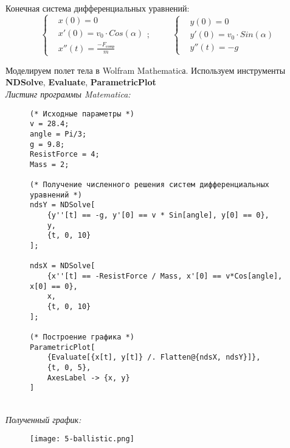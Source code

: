 Конечная система дифференциальных уравнений:
\begin{equation*}
    \left\{
        \begin{aligned}
            &x(0) = 0 \\
            &x'(0) = v_{0} \cdot Cos(\alpha) \\
            &x''(t) = \frac{-F_{\text{сопр}}}{m}
        \end{aligned}
    \right.; \;\;\;\;\;\;\;\;\;
    \left\{
        \begin{aligned}
            &y(0) = 0 \\
            &y'(0) = v_{0} \cdot Sin(\alpha) \\
            &y''(t) = -g
        \end{aligned}
    \right. \end{equation*}

\newpage
Моделируем полет тела в Wolfram Mathematicа. 
Используем инструменты 
\textbf{NDSolve}, 
\textbf{Evaluate},
\textbf{ParametricPlot}\\

\textit{Листинг программы Matematica:}
\begin{figure}[ht]
    \begin{lstlisting}
(* Исходные параметры *)
v = 28.4;
angle = Pi/3;
g = 9.8;
ResistForce = 4;
Mass = 2;

(* Получение численного решения систем дифференциальных уравнений *)
ndsY = NDSolve[
    {y''[t] == -g, y'[0] == v * Sin[angle], y[0] == 0}, 
    y, 
    {t, 0, 10}
];
   
ndsX = NDSolve[
    {x''[t] == -ResistForce / Mass, x'[0] == v*Cos[angle], x[0] == 0}, 
    x, 
    {t, 0, 10}
];

(* Построение графика *)
ParametricPlot[
    {Evaluate[{x[t], y[t]} /. Flatten@{ndsX, ndsY}]}, 
    {t, 0, 5},
    AxesLabel -> {x, y}
] 
    \end{lstlisting} 
\end{figure}\\
\textit{Полученный график:}
\begin{figure}[ht]
\centering
\texttt{[image: 5-ballistic.png]}
\end{figure}
